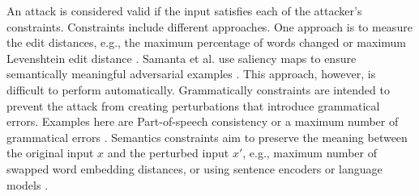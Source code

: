     An attack is considered valid if the input satisfies each of the attacker's constraints. 
    Constraints include different approaches. One approach is to measure the edit distances, e.g., the maximum percentage of words changed \cite{ebrahimi2017hotflip} or maximum Levenshtein edit distance \cite{gao2018black}. Samanta et al. use saliency maps to ensure semantically meaningful adversarial examples \cite{samanta2017towards}. This approach, however, is difficult to perform automatically. Grammatically constraints are intended to prevent the attack from creating perturbations that introduce grammatical errors. Examples here are Part-of-speech consistency or a maximum number of grammatical errors \cite{ebrahimi2017hotflip, jin2019bert}. Semantics constraints aim to preserve the meaning between the original input $x$ and the perturbed input $x'$, e.g., maximum number of swapped word embedding distances, or using sentence encoders or language models \cite{cer2018universal, garg2020bae, jin2019bert, li2018textbugger, alzantot2018generating, ebrahimi2017hotflip}.


